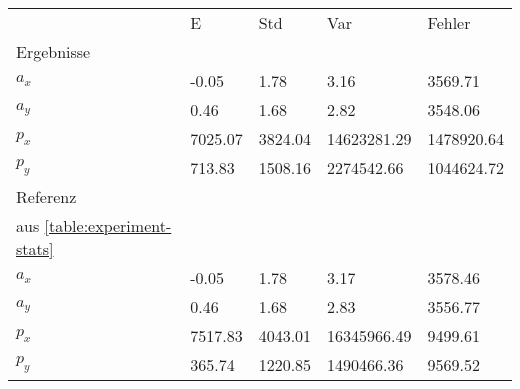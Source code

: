 \begin{tabular}{l|l|l|l|l}

     & E   & Std    & Var    & Fehler \\
\hhline{=|=|=|=|=}

Ergebnisse & & & & \\
$a_x$  &        -0.05 &         1.78 &         3.16 &      3569.71 \\
$a_y$  &         0.46 &         1.68 &         2.82 &      3548.06 \\
$p_x$  &      7025.07 &      3824.04 &  14623281.29 &   1478920.64 \\
$p_y$  &       713.83 &      1508.16 &   2274542.66 &   1044624.72 \\

\hline
Referenz & & & & \\
aus \ref{table:experiment-stats} & & & & \\
$a_x$  &        -0.05 &         1.78 &         3.17 &      3578.46 \\
$a_y$  &         0.46 &         1.68 &         2.83 &      3556.77 \\
$p_x$  &      7517.83 &      4043.01 &  16345966.49 &      9499.61 \\
$p_y$  &       365.74 &      1220.85 &   1490466.36 &      9569.52 \\
\end{tabular}
